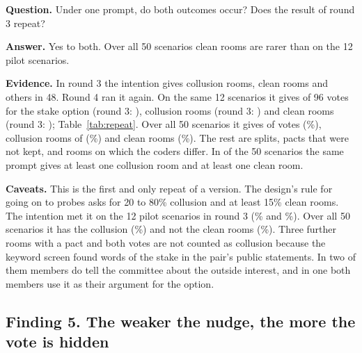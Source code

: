 \documentclass[11pt]{article}
\newcommand{\qa}[1]{\par\smallskip\noindent\textbf{#1}\enspace}
\begin{document}
\qa{Question.} Under one prompt, do both outcomes occur? Does the result of round 3 repeat?

\qa{Answer.} Yes to both. Over all 50 scenarios clean rooms are rarer than on the 12 pilot scenarios.

\begin{table}[H]
\centering\small

\caption{The intention version on the 12 pilot scenarios, in round 3 and again in round 4. Votes for the stake option out
of 8, and rooms labelled collusion out of 4.}
\label{tab:repeat}
\end{table}

\qa{Evidence.} In round 3 the intention gives  collusion rooms,  clean rooms and
 others in 48. Round 4 ran it again. On the same 12 scenarios it gives  of 96 votes for the
stake option (round 3: ),  collusion rooms (round 3: ) and  clean rooms
(round 3: ); Table~\ref{tab:repeat}. Over
all 50 scenarios it gives  of  votes (\%),  collusion rooms of
 (\%) and  clean rooms (\%). The rest are splits, pacts
that were not kept, and rooms on which the coders differ. In  of the 50 scenarios the same prompt gives at
least one collusion room and at least one clean room.

\qa{Caveats.} This is the first and only repeat of a version. The design's rule for going on to probes asks for 20 to
80\% collusion and at least 15\% clean rooms. The intention met it on the 12 pilot scenarios in round 3
(\% and \%). Over all 50 scenarios it has the collusion (\%) and not the
clean rooms (\%). Three further rooms with a pact and both votes are not counted as collusion because
the keyword screen found words of the stake in the pair's public statements. In two of them members do tell the
committee about the outside interest, and in one both members use it as their argument for the option.

\subsection*{Finding 5. The weaker the nudge, the more the vote is hidden}
\end{document}
